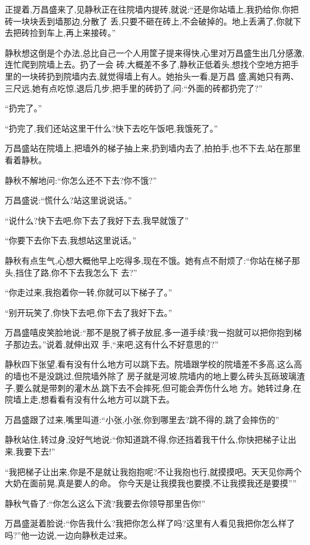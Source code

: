 ﻿\documentclass[12pt]{article}
\begin{document}
正提着,万昌盛来了,见静秋正在往院墙内提砖,就说:``还是你站墙上,我扔给你,你把砖一块块丢到墙那边,分散了
丢,只要不砸在砖上,不会破掉的。地上丢满了,你就下去把砖捡到车上,再上来接砖。''

静秋想这倒是个办法,总比自己一个人用筐子提来得快,心里对万昌盛生出几分感激,连忙爬到院墙上去。扔了一会
砖,大概差不多了,静秋正低着头,想找个空地方把手里的一块砖扔到院墙内去,就觉得墙上有人。她抬头一看,是万昌
盛,离她只有两、三尺远,她有点吃惊,退后几步,把手里的砖扔了,问:``外面的砖都扔完了?''

``扔完了。''

``扔完了,我们还站这里干什么?快下去吃午饭吧,我饿死了。''

万昌盛站在院墙上,把墙外的梯子抽上来,扔到墙内去了,拍拍手,也不下去,站在那里看着静秋。

静秋不解地问:``你怎么还不下去?你不饿?''

万昌盛说:``慌什么?站这里说说话。''

``说什么?快下去吧,你下去了我好下去,我早就饿了\myrule ''

``你要下去你下去,我想站这里说话。''

静秋有点生气,心想大概他早上吃得多,现在不饿。她有点不耐烦了:``你站在梯子那头,挡住了路,你不下去我怎么下
去?''

``你走过来,我抱着你一转,你就可以下梯子了。''

``别开玩笑了,你快下去吧,你下去了我好下去。''

万昌盛嘻皮笑脸地说:``那不是脱了裤子放屁,多一道手续?我一抱就可以把你抱到梯子那边去。''说着,就伸出双
手,``来吧,这有什么不好意思的?''

静秋四下张望,看有没有什么地方可以跳下去。院墙跟学校的院墙差不多高,这么高的墙也不是没跳过,但院墙外除了
房子就是河坡,院墙内的地上要么砖头瓦砾玻璃渣子,要么就是带刺的灌木丛,跳下去不会摔死,但可能会弄伤什么地
方。她转过身,在院墙上走,想看看有没有什么地方可以跳下去。

万昌盛跟了过来,嘴里叫道:``小张,小张,你到哪里去?跳不得的,跳了会摔伤的\myrule ''

静秋站住,转过身,没好气地说:``你知道跳不得,你还挡着我干什么,你快把梯子让出来,我要下去!''

``我把梯子让出来,你是不是就让我抱抱呢?不让我抱也行,就摸摸吧。天天见你两个大奶在面前晃,真是要人的命。
你今天是让我摸我也要摸,不让我摸我还是要摸\myrule ''''

静秋气昏了:``你怎么这么下流?我要去你领导那里告你!''

万昌盛涎着脸说:``你告我什么?我把你怎么样了吗?这里有人看见我把你怎么样了吗?''他一边说,一边向静秋走过来。
\end{document}
